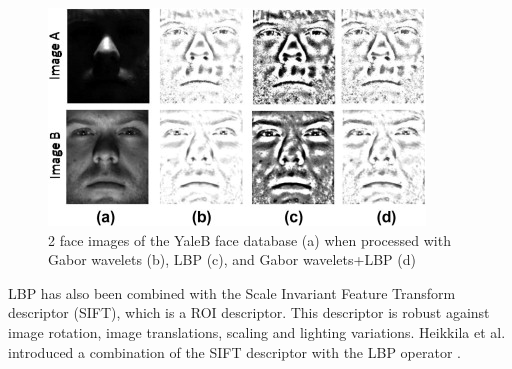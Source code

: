 \begin{figure}[!h]
\begin{center}
\noindent \includegraphics[scale=1]{figures/combination_lbp_gabor} 
\newline

\caption{2 face images of the YaleB face database (a) when processed with Gabor wavelets (b), LBP (c), and Gabor wavelets+LBP (d)\cite{GOH11}}
\label{combination_lbp_gabor}
\end{center} 
\end{figure}

\noindent  LBP has also been combined with the Scale Invariant Feature Transform descriptor (SIFT), which is a ROI descriptor. This descriptor is robust against image rotation, image translations, scaling and lighting variations. Heikkila et al. introduced a combination of the SIFT descriptor with the LBP operator \cite{HEI09}.
\newline
